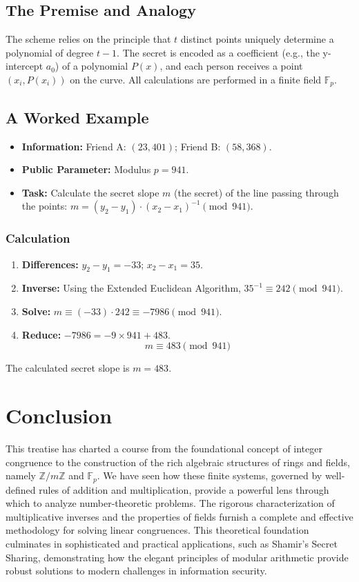 \subsection{The Premise and Analogy}
The scheme relies on the principle that $t$ distinct points uniquely determine a polynomial of degree $t-1$. The secret is encoded as a coefficient (e.g., the y-intercept $a_0$) of a polynomial $P(x)$, and each person receives a point $(x_i, P(x_i))$ on the curve. All calculations are performed in a finite field $\mathbb{F}_p$.

\subsection{A Worked Example}
\begin{itemize}
    \item \textbf{Information:} Friend A: $(23, 401)$; Friend B: $(58, 368)$.
    \item \textbf{Public Parameter:} Modulus $p = 941$.
    \item \textbf{Task:} Calculate the secret slope $m$ (the secret) of the line passing through the points: $m = (y_2 - y_1) \cdot (x_2 - x_1)^{-1} \pmod{941}$.
\end{itemize}
\subsubsection*{Calculation}
\begin{enumerate}
    \item \textbf{Differences:} $y_2 - y_1 = -33$; $x_2 - x_1 = 35$.
    \item \textbf{Inverse:} Using the Extended Euclidean Algorithm, $35^{-1} \equiv 242 \pmod{941}$.
    \item \textbf{Solve:} $m \equiv (-33) \cdot 242 \equiv -7986 \pmod{941}$.
    \item \textbf{Reduce:} $-7986 = -9 \times 941 + 483$.
    $$ m \equiv 483 \pmod{941} $$
\end{enumerate}
The calculated secret slope is $m = 483$.

\section{Conclusion}
This treatise has charted a course from the foundational concept of integer congruence to the construction of the rich algebraic structures of rings and fields, namely $\mathbb{Z}/m\mathbb{Z}$ and $\mathbb{F}_p$. We have seen how these finite systems, governed by well-defined rules of addition and multiplication, provide a powerful lens through which to analyze number-theoretic problems. The rigorous characterization of multiplicative inverses and the properties of fields furnish a complete and effective methodology for solving linear congruences. This theoretical foundation culminates in sophisticated and practical applications, such as Shamir's Secret Sharing, demonstrating how the elegant principles of modular arithmetic provide robust solutions to modern challenges in information security.